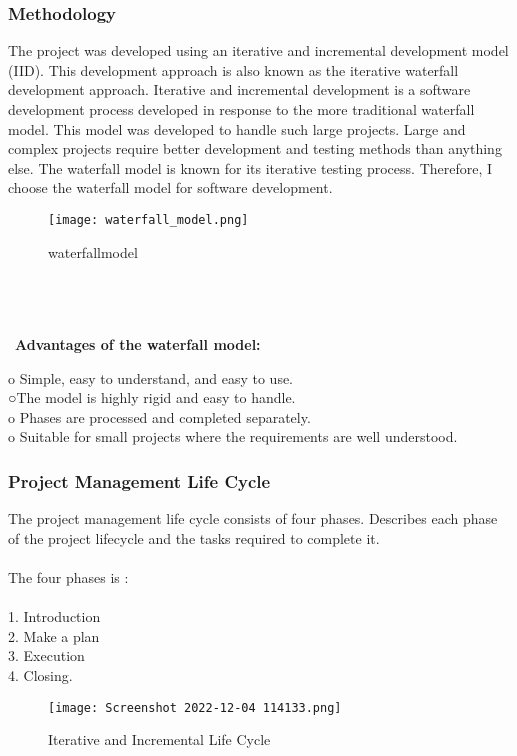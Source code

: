 \documentclass{article}
\begin{document}
\subsubsection{Methodology}
The project was developed using an iterative and incremental development model (IID). This development approach is also known as the iterative waterfall development approach. Iterative and incremental development is a software development process developed in response to the more traditional waterfall model. This model was developed to handle such large projects. Large and complex projects require better development and testing methods than anything else. The waterfall model is known for its iterative testing process. Therefore, I choose the waterfall model for software development.
\begin{figure}[htp]
    \centering
    \texttt{[image: waterfall\_model.png]}
    \caption{waterfallmodel}
    \label{fig:waterfallmodel}
\end{figure}
\\\\\\\
\textbf{Advantages of the waterfall model:}

o Simple, easy to understand, and easy to use. \\
○The model is highly rigid and easy to handle. \\
o Phases are processed and completed separately. \\
o Suitable for small projects where the requirements are well understood.\\

\newpage
\subsubsection{Project Management Life Cycle}
The project management life cycle consists of four phases. Describes each phase of the project lifecycle and the tasks required to complete it.\\\\
The four phases is : 
\\\\
1. Introduction\\
2. Make a plan\\
3. Execution\\
4. Closing. \\

\begin{figure}[htp]
    \centering
    \texttt{[image: Screenshot 2022-12-04 114133.png]}
    \caption{Iterative and Incremental Life Cycle }
    \label{fig:Iterative and Incremental Life Cycle }
\end{figure}
\\\\\\\
\newpage
\end{document}
